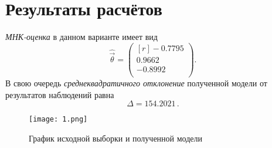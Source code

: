 

\section{Результаты расчётов}
\emph{МНК-оценка} в данном варианте имеет вид
\begin{equation}
    \hat{\vec{\theta}} = \begin{pmatrix*}[r]
        -0.7795 \\
        0.9662 \\
        -0.8992\\
    \end{pmatrix*}.
\end{equation}
В свою очередь \emph{среднеквадратичного отклонение} полученной модели от результатов наблюдений равна
\begin{equation}
    \Delta = 154.2021\,.
\end{equation}

\begin{figure}[h]
    \centering
    \texttt{[image: 1.png]}
    \caption{График исходной выборки и полученной модели}
\end{figure}